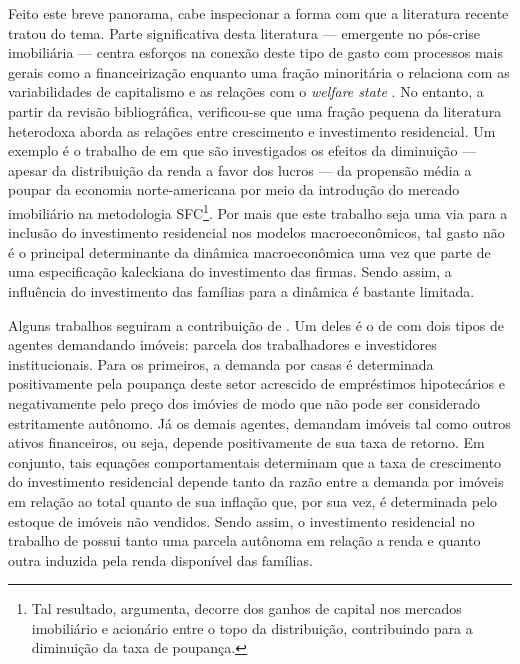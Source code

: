 Feito este breve panorama, cabe inspecionar a forma com que a literatura recente tratou do tema. 
Parte significativa desta literatura  --- emergente no pós-crise imobiliária --- centra esforços na conexão deste tipo de gasto com processos mais gerais como a financeirização \cites{aalbers_financialization_2008}{bibow_financialization_2010}
enquanto uma fração minoritária o relaciona com as variabilidades
de capitalismo e as relações com o \textit{welfare state} \cite{schwartz_politics_2009}. No
entanto, a partir da revisão bibliográfica, verificou-se que uma fração pequena da literatura heterodoxa aborda as relações entre crescimento e investimento residencial.
Um  exemplo é o trabalho de \textcite{zezza_u.s._2008} em que são investigados os efeitos da diminuição --- apesar da distribuição da renda a favor dos lucros --- da propensão média a poupar da economia norte-americana por meio da introdução do mercado imobiliário na metodologia SFC\footnote{
	Tal resultado, argumenta, decorre dos ganhos de capital nos mercados imobiliário e acionário entre o topo da distribuição, contribuindo para a diminuição da taxa de poupança.
}. 
Por mais que este trabalho seja uma via para a inclusão do investimento residencial nos modelos macroeconômicos, tal gasto não é o principal determinante da dinâmica macroeconômica uma vez que parte de uma especificação kaleckiana do investimento das firmas.
Sendo assim, a influência do investimento das famílias para a dinâmica é bastante limitada.


Alguns trabalhos seguiram a contribuição de \textcite{zezza_u.s._2008}.
Um deles é o de \textcite{nikolaidi_securitisation_2015} com dois tipos de agentes demandando imóveis: parcela dos trabalhadores e investidores institucionais.
Para os primeiros, a demanda por casas é determinada positivamente pela poupança deste setor acrescido de empréstimos hipotecários e negativamente pelo preço dos imóvies de modo que não pode ser considerado estritamente autônomo.
Já os demais agentes, demandam imóveis tal como outros ativos financeiros, ou seja, depende positivamente de sua taxa de retorno.
Em conjunto, tais equações comportamentais determinam que a taxa de crescimento do investimento residencial depende tanto da razão entre a demanda por imóveis em relação ao total quanto de sua inflação que, por sua vez, é determinada pelo estoque de imóveis não vendidos.
Sendo assim, o investimento residencial no trabalho de \textcite{nikolaidi_securitisation_2015} possui tanto uma parcela autônoma em relação a renda e quanto outra induzida pela renda disponível das famílias.

